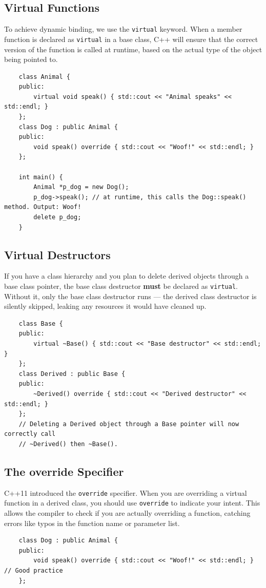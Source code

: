 \subsection{Virtual Functions}
To achieve dynamic binding, we use the \texttt{virtual} keyword. When a member function is declared as \texttt{virtual} in a base class, C++ will ensure that the correct version of the function is called at runtime, based on the actual type of the object being pointed to.
\begin{lstlisting}
	class Animal {
	public:
		virtual void speak() { std::cout << "Animal speaks" << std::endl; }
	};
	class Dog : public Animal {
	public:
		void speak() override { std::cout << "Woof!" << std::endl; }
	};

	int main() {
		Animal *p_dog = new Dog();
		p_dog->speak(); // at runtime, this calls the Dog::speak() method. Output: Woof!
		delete p_dog;
	}
\end{lstlisting}

\subsection{Virtual Destructors}
If you have a class hierarchy and you plan to delete derived objects through a base class pointer, the base class destructor \textbf{must} be declared as \texttt{virtual}. Without it, only the base class destructor runs — the derived class destructor is silently skipped, leaking any resources it would have cleaned up.
\begin{lstlisting}
	class Base {
	public:
		virtual ~Base() { std::cout << "Base destructor" << std::endl; }
	};
	class Derived : public Base {
	public:
		~Derived() override { std::cout << "Derived destructor" << std::endl; }
	};
	// Deleting a Derived object through a Base pointer will now correctly call
	// ~Derived() then ~Base().
\end{lstlisting}

\subsection{The override Specifier}
C++11 introduced the \texttt{override} specifier. When you are overriding a virtual function in a derived class, you should use \texttt{override} to indicate your intent. This allows the compiler to check if you are actually overriding a function, catching errors like typos in the function name or parameter list.
\begin{lstlisting}
	class Dog : public Animal {
	public:
		void speak() override { std::cout << "Woof!" << std::endl; } // Good practice
	};
\end{lstlisting}

